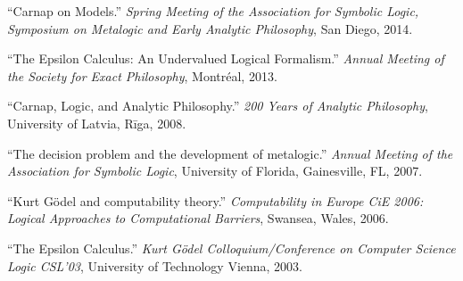 \documentclass[11pt]{article}
\def\printdate#1{\xprintdate#1-}
\def\xprintdate#1-#2-#3-{#1}
\begin{document}
\ind ``Carnap on Models.'' \emph{Spring Meeting of the Association for Symbolic Logic, Symposium on
Metalogic and Early Analytic Philosophy}, San Diego, \printdate{2014-04-017}.






\ind ``The Epsilon Calculus: An Undervalued Logical Formalism.'' \emph{Annual Meeting of the Society for Exact Philosophy}, Montréal, \printdate{2013-05-26}.














\ind ``Carnap, Logic, and Analytic Philosophy.'' \emph{200 Years of Analytic Philosophy}, University of Latvia, Rīga, \printdate{2008-08-29}.







\ind ``The decision problem and the development of metalogic.'' \emph{Annual Meeting of the Association for Symbolic Logic}, University of Florida, Gainesville, FL, \printdate{2007-03-012}.




\ind ``Kurt Gödel and computability theory.'' \emph{Computability in Europe CiE 2006: Logical Approaches to Computational
Barriers}, Swansea, Wales, \printdate{2006-07-05}.





















\ind ``The Epsilon Calculus.'' \emph{Kurt Gödel Colloquium/Conference on Computer Science Logic CSL'03}, University of Technology Vienna, \printdate{2003-08-26}.
\end{document}
